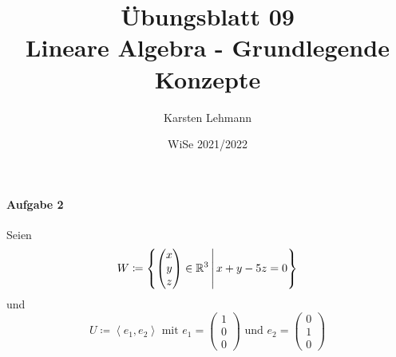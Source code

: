 \documentclass{scrreprt}
\author{Karsten Lehmann}
\date{WiSe 2021/2022}
\title{Übungsblatt 09\\Lineare Algebra - Grundlegende Konzepte}
\newcommand\hull[1]{\left\langle #1 \right\rangle}
\begin{document}
\paragraph{Aufgabe 2} Seien
\[
  W \coloneqq \qty{
    \begin{pmatrix} x \\ y \\ z \end{pmatrix} \in \mathbb{R}^3
    \, \middle | \,
    x + y - 5z = 0
  }
\]
und
\[
  U \coloneqq \hull{e_1, e_2} \text{ mit }
  e_1 = \begin{pmatrix} 1 \\ 0 \\ 0 \end{pmatrix}
  \text{ und }
  e_2 = \begin{pmatrix} 0 \\ 1 \\ 0 \end{pmatrix}
\]
\end{document}
